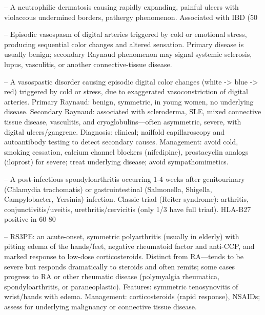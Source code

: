 -- A neutrophilic dermatosis causing rapidly expanding, painful ulcers with violaceous undermined borders, pathergy phenomenon. Associated with IBD (50%

-- Episodic vasospasm of digital arteries triggered by cold or emotional stress, producing sequential color changes and altered sensation. Primary disease is usually benign; secondary Raynaud phenomenon may signal systemic sclerosis, lupus, vasculitis, or another connective-tissue disease.

-- A vasospastic disorder causing episodic digital color changes (white -> blue -> red) triggered by cold or stress, due to exaggerated vasoconstriction of digital arteries. Primary Raynaud: benign, symmetric, in young women, no underlying disease. Secondary Raynaud: associated with scleroderma, SLE, mixed connective tissue disease, vasculitis, and cryoglobulins—often asymmetric, severe, with digital ulcers/gangrene. Diagnosis: clinical; nailfold capillaroscopy and autoantibody testing to detect secondary causes. Management: avoid cold, smoking cessation, calcium channel blockers (nifedipine), prostacyclin analogs (iloprost) for severe; treat underlying disease; avoid sympathomimetics.

-- A post-infectious spondyloarthritis occurring 1-4 weeks after genitourinary (Chlamydia trachomatis) or gastrointestinal (Salmonella, Shigella, Campylobacter, Yersinia) infection. Classic triad (Reiter syndrome): arthritis, conjunctivitis/uveitis, urethritis/cervicitis (only 1/3 have full triad). HLA-B27 positive in 60-80%

-- RS3PE: an acute-onset, symmetric polyarthritis (usually in elderly) with pitting edema of the hands/feet, negative rheumatoid factor and anti-CCP, and marked response to low-dose corticosteroids. Distinct from RA—tends to be severe but responds dramatically to steroids and often remits; some cases progress to RA or other rheumatic disease (polymyalgia rheumatica, spondyloarthritis, or paraneoplastic). Features: symmetric tenosynovitis of wrist/hands with edema. Management: corticosteroids (rapid response), NSAIDs; assess for underlying malignancy or connective tissue disease.

